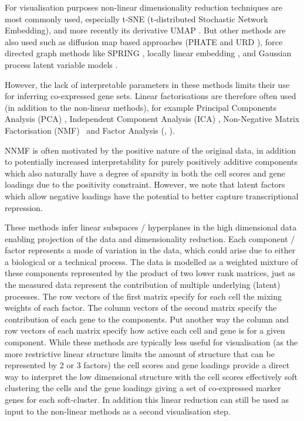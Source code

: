 For visualisation purposes non-linear dimensionality reduction techniques are most commonly used, especially t-SNE (t-distributed Stochastic Network Embedding), and more recently its derivative UMAP \parencite{McInnes2018UMAP,Becht2019Dimensionality}. But other methods are also used such as diffusion map based approaches (PHATE and URD \cite{Haghverdi2015Diffusion, Moon2019Visualizing, Farrell2018Singlecell}), force directed graph methods like SPRING \parencite{Weinreb2018SPRING, Wagner2018Singlecell}, locally linear embedding \parencite{Welch2016SLICER}, and Gaussian process latent variable models \parencite{Campbell2015Bayesian}.

However, the lack of interpretable parameters in these methods limits their use for inferring co-expressed gene sets. Linear factorisations are therefore often used (in addition to the non-linear methods), for example Principal Components Analysis (PCA) \parencite{Alter2000Singular, Green2018Comprehensive},  Independent Component Analysis (ICA) \parencite{Saunders2018Molecular}, Non-Negative Matrix Factorisation (NMF)~\cite{Brunet2004Metagenes, Kim2003Subsystem, Shao2017Robust, Zhu2017Detecting, Duren2018Integrative, Kotliar2018Identifying, Welch2019SingleCell} and Factor Analysis (\cite{Bernardo2003Bayesian, Buettner2015Computational}, \cite[reviewed in][]{Stein-OBrien2018Enter}).


NNMF is often motivated by the positive nature of the original data, in addition to potentially increased interpretability for purely positively additive components which also naturally have a degree of sparsity in both the cell scores and gene loadings due to the positivity constraint. However, we note that latent factors which allow negative loadings have the potential to better capture transcriptional repression. 

These methods infer linear subspaces / hyperplanes in the high dimensional data enabling projection of the data and dimensionality reduction. Each component / factor represents a mode of variation in the data, which could arise due to either a biological or a technical process. The data is modelled as a weighted mixture of these components represented by the product of two lower rank matrices, just as the measured data represent the contribution of multiple underlying (latent) processes. The row vectors of the first matrix specify for each cell the mixing weights of each factor. The column vectors of the second matrix specify the contribution of each gene to the components. Put another way the column and row vectors of each matrix specify how active each cell and gene is for a given component. While these methods are typically less useful for visualisation (as the more restrictive linear structure limits the amount of structure that can be represented by 2 or 3 factors) the cell scores and gene loadings provide a direct way to interpret the low dimensional structure with the cell scores effectively soft clustering the cells and the gene loadings giving a set of co-expressed marker genes for each soft-cluster. In addition this linear reduction can still be used as input to the non-linear methods as a second visualisation step.

